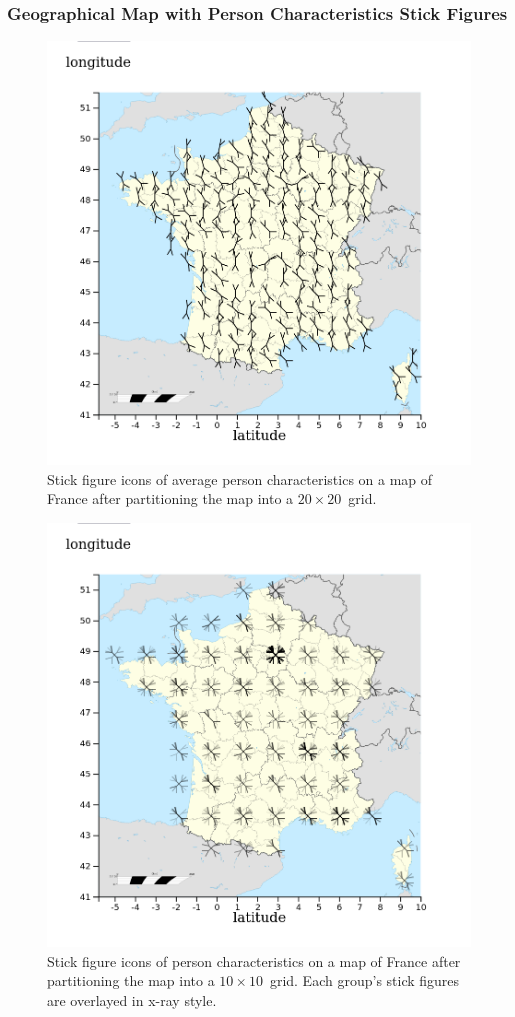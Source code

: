 \subsubsection{Geographical Map with Person Characteristics Stick Figures}
\begin{figure}
    \centering
    \includegraphics[width=0.6\linewidth]{figures/stick-figures-by-grid-20-20-average.png}
    \caption{Stick figure icons of average person characteristics on a map of France after partitioning the map into a \(20 \times 20\)~grid.}
    \label{figure-stick-figures-grid-average}
\end{figure}
\begin{figure}
    \centering
    \includegraphics[width=0.6\linewidth]{figures/stick-figures-by-grid-10-10-xray.png}
    \caption{Stick figure icons of person characteristics on a map of France after partitioning the map into a \(10 \times 10\)~grid. Each group's stick figures are overlayed in x-ray style.}
    \label{figure-stick-figures-grid-xray}
\end{figure}
